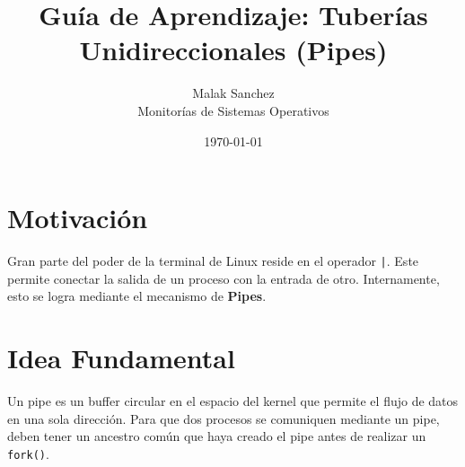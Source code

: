 \documentclass[12pt,a4paper]{article}
\title{\textbf{Guía de Aprendizaje: Tuberías Unidireccionales (Pipes)}}
\author{Malak Sanchez \\ \small Monitorías de Sistemas Operativos}
\date{\today}
\begin{document}
\maketitle

\section{Motivación}
Gran parte del poder de la terminal de Linux reside en el operador \texttt{|}. Este permite conectar la salida de un proceso con la entrada de otro. Internamente, esto se logra mediante el mecanismo de \textbf{Pipes}.

\section{Idea Fundamental}
Un pipe es un buffer circular en el espacio del kernel que permite el flujo de datos en una sola dirección. Para que dos procesos se comuniquen mediante un pipe, deben tener un ancestro común que haya creado el pipe antes de realizar un \texttt{fork()}.
\end{document}
